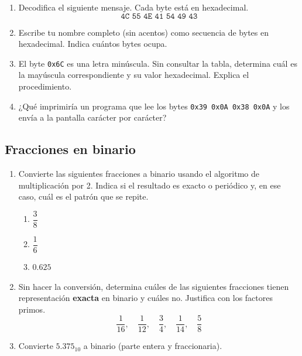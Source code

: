 \documentclass[12pt, oneside]{article}
\begin{document}
\begin{enumerate}[resume]

  \item Decodifica el siguiente mensaje. Cada byte está en hexadecimal.
        \[
          \texttt{4C\ 55\ 4E\ 41\ 54\ 49\ 43}
        \]

  \item Escribe tu nombre completo (sin acentos) como secuencia de bytes
        en hexadecimal. Indica cuántos bytes ocupa.

  \item El byte \texttt{0x6C} es una letra minúscula. Sin consultar la
        tabla, determina cuál es la mayúscula correspondiente y su valor
        hexadecimal. Explica el procedimiento.

  \item ¿Qué imprimiría un programa que lee los bytes
        \texttt{0x39\ 0x0A\ 0x38\ 0x0A} y los envía a la pantalla
        carácter por carácter?

\end{enumerate}

\subsection{Fracciones en binario}

\begin{enumerate}[resume]

  \item Convierte las siguientes fracciones a binario usando el algoritmo
        de multiplicación por 2. Indica si el resultado es exacto o
        periódico y, en ese caso, cuál es el patrón que se repite.
        \begin{enumerate}
          \item $\dfrac{3}{8}$
          \item $\dfrac{1}{6}$
          \item $0.625$
        \end{enumerate}

  \item Sin hacer la conversión, determina cuáles de las siguientes
        fracciones tienen representación \textbf{exacta} en binario y
        cuáles no. Justifica con los factores primos.
        \[
          \frac{1}{16}, \quad \frac{1}{12}, \quad \frac{3}{4},
          \quad \frac{1}{14}, \quad \frac{5}{8}
        \]

  \item Convierte $5.375_{10}$ a binario (parte entera y fraccionaria).

\end{enumerate}
\end{document}
